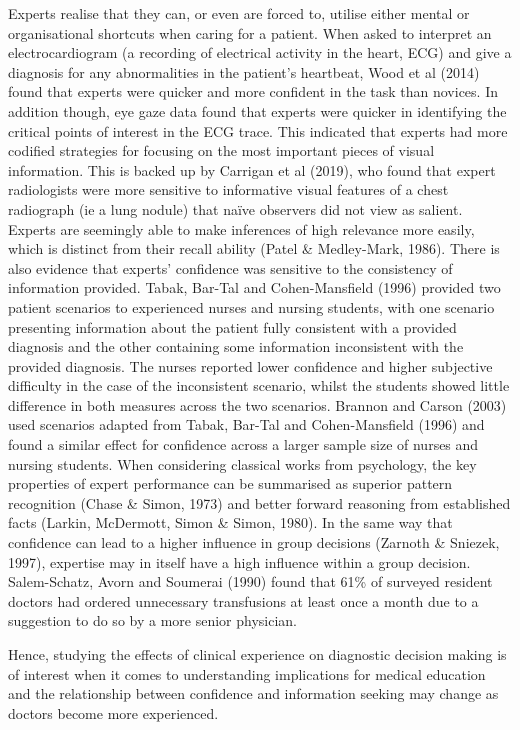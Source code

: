 \documentclass[a4paper, nobind]{templates/ociamthesis}
\begin{document}
Experts realise that they can, or even are forced to, utilise either mental or organisational shortcuts when caring for a patient. When asked to interpret an electrocardiogram (a recording of electrical activity in the heart, ECG) and give a diagnosis for any abnormalities in the patient's heartbeat, Wood et al (2014) found that experts were quicker and more confident in the task than novices. In addition though, eye gaze data found that experts were quicker in identifying the critical points of interest in the ECG trace. This indicated that experts had more codified strategies for focusing on the most important pieces of visual information. This is backed up by Carrigan et al (2019), who found that expert radiologists were more sensitive to informative visual features of a chest radiograph (ie a lung nodule) that naïve observers did not view as salient. Experts are seemingly able to make inferences of high relevance more easily, which is distinct from their recall ability (Patel \& Medley-Mark, 1986). There is also evidence that experts' confidence was sensitive to the consistency of information provided. Tabak, Bar-Tal and Cohen-Mansfield (1996) provided two patient scenarios to experienced nurses and nursing students, with one scenario presenting information about the patient fully consistent with a provided diagnosis and the other containing some information inconsistent with the provided diagnosis. The nurses reported lower confidence and higher subjective difficulty in the case of the inconsistent scenario, whilst the students showed little difference in both measures across the two scenarios. Brannon and Carson (2003) used scenarios adapted from Tabak, Bar-Tal and Cohen-Mansfield (1996) and found a similar effect for confidence across a larger sample size of nurses and nursing students. When considering classical works from psychology, the key properties of expert performance can be summarised as superior pattern recognition (Chase \& Simon, 1973) and better forward reasoning from established facts (Larkin, McDermott, Simon \& Simon, 1980). In the same way that confidence can lead to a higher influence in group decisions (Zarnoth \& Sniezek, 1997), expertise may in itself have a high influence within a group decision. Salem-Schatz, Avorn and Soumerai (1990) found that 61\% of surveyed resident doctors had ordered unnecessary transfusions at least once a month due to a suggestion to do so by a more senior physician.

Hence, studying the effects of clinical experience on diagnostic decision making is of interest when it comes to understanding implications for medical education and the relationship between confidence and information seeking may change as doctors become more experienced.
\end{document}
